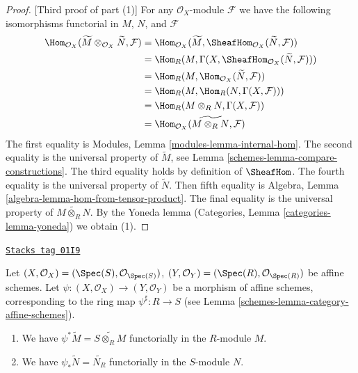 \begin{proof}
[Third proof of part (1)]
For any $\mathcal{O}_X$-module $\mathcal{F}$
we have the following isomorphisms functorial in $M$, $N$, and $\mathcal{F}$
\begin{align*}
\Hom_{\mathcal{O}_X}(\widetilde{M} \otimes _{\mathcal{O} _X} \widetilde{N},
\mathcal{F})
& =
\Hom_{\mathcal{O}_X}(\widetilde{M},
\SheafHom_{\mathcal{O} _X} (\widetilde{N}, \mathcal{F})) \\
& =
\Hom_R(M, \Gamma(X,
\SheafHom_{\mathcal{O}_X}(\widetilde{N}, \mathcal{F}))) \\
& =
\Hom_R(M, \Hom_{\mathcal{O}_X}(\widetilde{N}, \mathcal{F})) \\
& =
\Hom_R(M, \Hom_R(N, \Gamma(X,\mathcal{F}))) \\
& =
\Hom_R(M \otimes_R N, \Gamma(X, \mathcal{F})) \\
& =
\Hom_{\mathcal{O}_X}(\widetilde{M \otimes_R N}, \mathcal{F})
\end{align*}
The first equality is Modules, Lemma \ref{modules-lemma-internal-hom}.
The second equality is the universal property of $\widetilde{M}$, see
Lemma \ref{schemes-lemma-compare-constructions}. The third equality holds by
definition of $\SheafHom$. The fourth equality is the universal property
of $\widetilde{N}$. Then fifth equality is
Algebra, Lemma \ref{algebra-lemma-hom-from-tensor-product}.
The final equality is the universal property of
$\widetilde{M \otimes_R N}$.
By the Yoneda lemma (Categories, Lemma \ref{categories-lemma-yoneda})
we obtain (1).
\end{proof}

\begin{lemma}
\label{schemes-lemma-widetilde-pullback}
\href{https://stacks.math.columbia.edu/tag/01I9}{\texttt{Stacks tag 01I9}}

Let
$(X, \mathcal{O}_X) = (\Spec(S), \mathcal{O}_{\Spec(S)})$,
$(Y, \mathcal{O}_Y) = (\Spec(R), \mathcal{O}_{\Spec(R)})$
be affine schemes.
Let $\psi : (X, \mathcal{O}_X) \to (Y, \mathcal{O}_Y)$ be a
morphism of affine schemes, corresponding to the ring map
$\psi^\sharp : R \to S$ (see Lemma \ref{schemes-lemma-category-affine-schemes}).
\begin{enumerate}
\item We have $\psi^* \widetilde M = \widetilde{S \otimes_R M}$
functorially in the $R$-module $M$.
\item We have $\psi_* \widetilde N = \widetilde{N_R}$ functorially
in the $S$-module $N$.
\end{enumerate}
\end{lemma}

